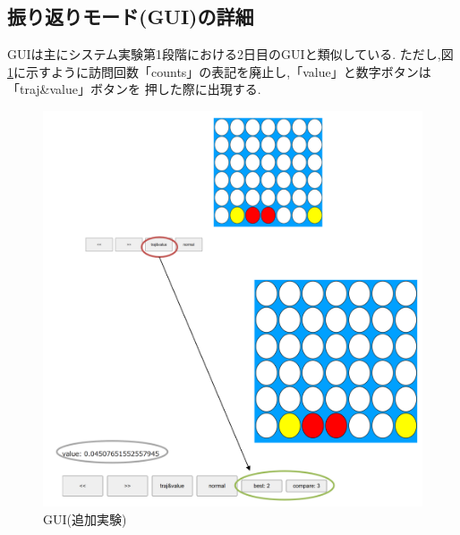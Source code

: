 \subsection{振り返りモード(GUI)の詳細}
GUIは主にシステム実験第1段階における2日目のGUIと類似している.
ただし,図\ref{fig:extra}に示すように訪問回数「counts」の表記を廃止し,「value」と数字ボタンは「traj\&value」ボタンを
押した際に出現する.
\begin{figure}[t]
	\centering
    \includegraphics[width=\linewidth]{./figure/extra.png}
	\caption{GUI(追加実験)}
	\label{fig:extra}
\end{figure}

